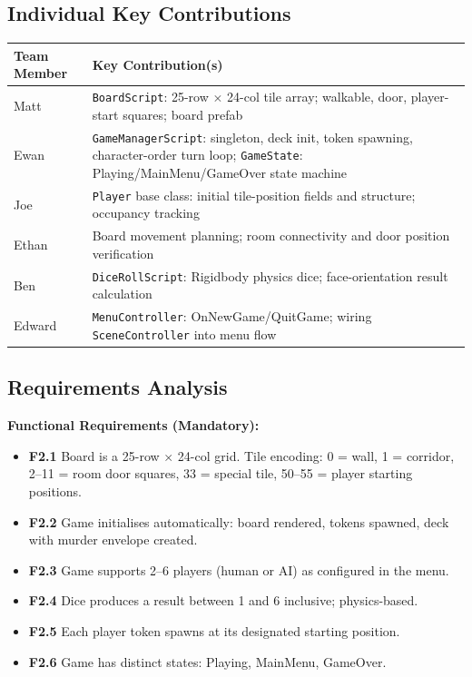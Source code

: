 \subsection*{Individual Key Contributions}
\begin{table}[H]
\centering
\footnotesize
\begin{tabular}{|p{1.8cm}|p{7.2cm}|}
\hline
\textbf{Team Member} & \textbf{Key Contribution(s)} \\ \hline
Matt & \texttt{BoardScript}: 25-row $\times$ 24-col tile array; walkable, door, player-start squares; board prefab \\ \hline
Ewan & \texttt{GameManagerScript}: singleton, deck init, token spawning, character-order turn loop; \texttt{GameState}: Playing/MainMenu/GameOver state machine \\ \hline
Joe & \texttt{Player} base class: initial tile-position fields and structure; occupancy tracking \\ \hline
Ethan & Board movement planning; room connectivity and door position verification \\ \hline
Ben & \texttt{DiceRollScript}: Rigidbody physics dice; face-orientation result calculation \\ \hline
Edward & \texttt{MenuController}: OnNewGame/QuitGame; wiring \texttt{SceneController} into menu flow \\ \hline
\end{tabular}
\end{table}

\subsection*{Requirements Analysis}

\textbf{Functional Requirements (Mandatory):}
\begin{itemize}
    \item \textbf{F2.1} Board is a 25-row $\times$ 24-col grid. Tile encoding: 0 = wall, 1 = corridor, 2--11 = room door squares, 33 = special tile, 50--55 = player starting positions.
    \item \textbf{F2.2} Game initialises automatically: board rendered, tokens spawned, deck with murder envelope created.
    \item \textbf{F2.3} Game supports 2--6 players (human or AI) as configured in the menu.
    \item \textbf{F2.4} Dice produces a result between 1 and 6 inclusive; physics-based.
    \item \textbf{F2.5} Each player token spawns at its designated starting position.
    \item \textbf{F2.6} Game has distinct states: Playing, MainMenu, GameOver.
\end{itemize}


